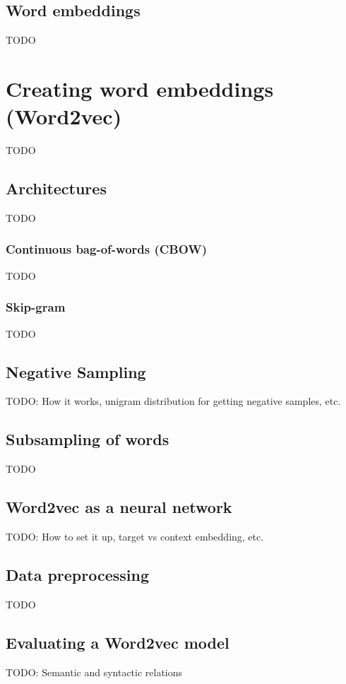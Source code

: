 \subsection{Word embeddings}
TODO

\section{Creating word embeddings (Word2vec)}
TODO

\subsection{Architectures}
TODO

\subsubsection{Continuous bag-of-words (CBOW)}
TODO

\subsubsection{Skip-gram}
TODO

\subsection{Negative Sampling}
TODO: How it works, unigram distribution for getting negative samples, etc.

\subsection{Subsampling of words}
TODO

\subsection{Word2vec as a neural network}
TODO: How to set it up, target vs context embedding, etc.

\subsection{Data preprocessing}
TODO

\subsection{Evaluating a Word2vec model}
TODO: Semantic and syntactic relations